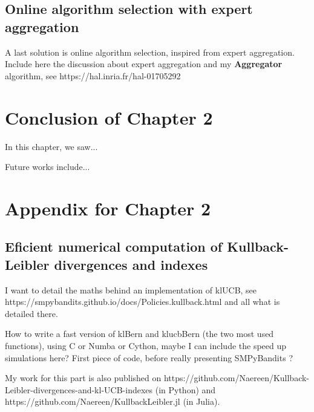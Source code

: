 \subsection{Online algorithm selection with expert aggregation}



A last solution is online algorithm selection, inspired from expert aggregation.
Include here the discussion about expert aggregation and my \textbf{Aggregator} algorithm, see https://hal.inria.fr/hal-01705292



\section{Conclusion of Chapter 2}
\label{sec:2:conclusion}

In this chapter, we saw...

Future works include...



\section{Appendix for Chapter 2}
\label{sec:2:appendix}

\subsection{Eficient numerical computation of Kullback-Leibler divergences and \klUCB{} indexes}

I want to detail the maths behind an implementation of klUCB, see https://smpybandits.github.io/docs/Policies.kullback.html and all what is detailed there.

How to write a fast version of klBern and klucbBern (the two most used functions), using C or Numba or Cython, maybe I can include the speed up simulations here? First piece of code, before really presenting SMPyBandits ?

My work for this part is also published on https://github.com/Naereen/Kullback-Leibler-divergences-and-kl-UCB-indexes
(in Python) and https://github.com/Naereen/KullbackLeibler.jl (in Julia).

